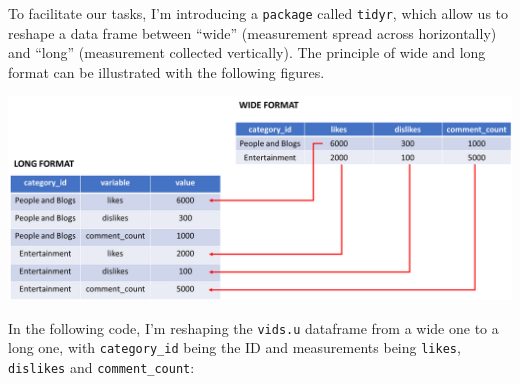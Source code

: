 \documentclass[]{article}
\newenvironment{Shaded}{\begin{snugshade}}{\end{snugshade}}
\newcommand{\CommentTok}[1]{\textcolor[rgb]{0.56,0.35,0.01}{\textit{#1}}}
\newcommand{\DataTypeTok}[1]{\textcolor[rgb]{0.13,0.29,0.53}{#1}}
\newcommand{\DecValTok}[1]{\textcolor[rgb]{0.00,0.00,0.81}{#1}}
\newcommand{\KeywordTok}[1]{\textcolor[rgb]{0.13,0.29,0.53}{\textbf{#1}}}
\newcommand{\NormalTok}[1]{#1}
\newcommand{\OperatorTok}[1]{\textcolor[rgb]{0.81,0.36,0.00}{\textbf{#1}}}
\newcommand{\StringTok}[1]{\textcolor[rgb]{0.31,0.60,0.02}{#1}}
\begin{document}
To facilitate our tasks, I'm introducing a \texttt{package} called
\texttt{tidyr}, which allow us to reshape a data frame between ``wide''
(measurement spread across horizontally) and ``long'' (measurement
collected vertically). The principle of wide and long format can be
illustrated with the following figures.

\begin{center}\includegraphics[width=1\linewidth]{assets/long_wide} \end{center}

In the following code, I'm reshaping the \texttt{vids.u} dataframe from
a wide one to a long one, with \texttt{category\_id} being the ID and
measurements being \texttt{likes}, \texttt{dislikes} and
\texttt{comment\_count}:

\begin{Shaded}
\end{Shaded}
\end{document}
